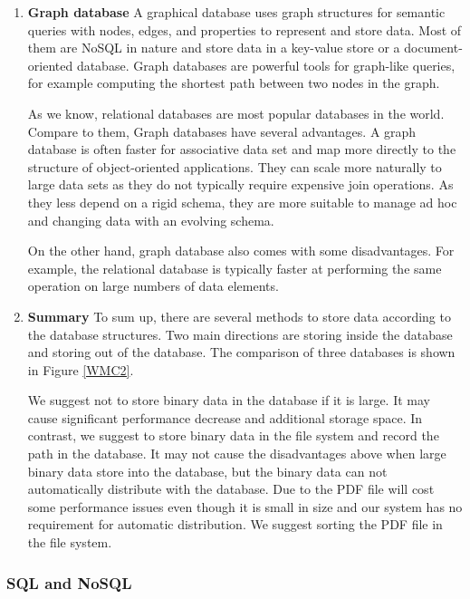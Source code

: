 \begin{enumerate}
	\item\textbf{Graph database}
	\setlength{\parindent}{1em}	
	A graphical database uses graph structures for semantic queries with nodes, edges, and properties to represent and store data.
	Most of them are NoSQL in nature and store data in a key-value store or a document-oriented database.
	Graph databases are powerful tools for graph-like queries, for example computing the shortest path between two nodes in the graph.
	
	As we know, relational databases are most popular databases in the world.
	Compare to them, Graph databases have several advantages.
	A graph database is often faster for associative data set and map more directly to the structure of object-oriented applications.
	They can scale more naturally to large data sets as they do not typically require expensive join operations.
	As they less depend on a rigid schema, they are more suitable to manage ad hoc and changing data with an evolving schema.
	
	On the other hand, graph database also comes with some disadvantages.
	For example, the relational database is typically faster at performing the same operation on large numbers of data elements.
	
	\item\textbf{Summary}
	\setlength{\parindent}{1em}	
    To sum up, there are several methods to store data according to the database structures.
    Two main directions are storing inside the database and storing out of the database.
    The comparison of three databases is shown in Figure \ref{WMC2}.
    
    We suggest not to store binary data in the database if it is large.
    It may cause significant performance decrease and additional storage space.
    In contrast, we suggest to store binary data in the file system and record the path in the database.
    It may not cause the disadvantages above when large binary data store into the database, but the binary data can not automatically distribute with the database.
    Due to the PDF file will cost some performance issues even though it is small in size and our system has no requirement for automatic distribution.
    We suggest sorting the PDF file in the file system.
	
\end{enumerate}

\subsubsection{SQL and NoSQL}

